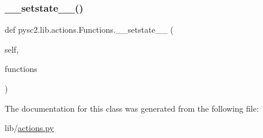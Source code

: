 \mbox{\label{classpysc2_1_1lib_1_1actions_1_1_functions_afeec98d7917f5f74ece2df8d52d53eb5}} 
\subsubsection{\texorpdfstring{\+\_\+\+\_\+setstate\+\_\+\+\_\+()}{\_\_setstate\_\_()}}
{\footnotesize\ttfamily def pysc2.\+lib.\+actions.\+Functions.\+\_\+\+\_\+setstate\+\_\+\+\_\+ (\begin{DoxyParamCaption}\item[{}]{self,  }\item[{}]{functions }\end{DoxyParamCaption})}



The documentation for this class was generated from the following file\+:\begin{DoxyCompactItemize}
\item 
lib/\mbox{\hyperlink{actions_8py}{actions.\+py}}\end{DoxyCompactItemize}
